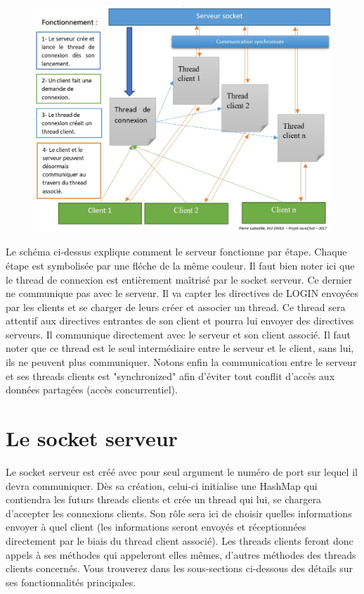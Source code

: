 \documentclass[a4paper,12pt]{report}
\begin{document}
    \begin{figure}[!ht]%
      \centering 
      \includegraphics[width=16cm]{serverWorks.jpg}
    \end{figure}

    \bigbreak
    Le schéma ci-dessus explique comment le serveur fonctionne par étape. Chaque étape est symbolisée par une fléche de la même couleur. Il faut bien noter ici que le thread de connexion est entièrement maîtrisé par le socket serveur. Ce dernier ne communique pas avec le serveur. Il va capter les directives de LOGIN envoyées par les clients et se charger de leurs créer et associer un thread.
    \medbreak
    Ce thread sera attentif aux directives entrantes de son client et pourra lui envoyer des directives serveurs. Il communique directement avec le serveur et son client associé. Il faut noter que ce thread est le seul intermédiaire entre le serveur et le client, sans lui, ils ne peuvent plus communiquer. Notons enfin la communication entre le serveur et ses threads clients est "synchronized" afin d'éviter tout conflit d'accès aux données partagées (accès concurrentiel).

    \section{Le socket serveur}
      Le socket serveur est créé avec pour seul argument le numéro de port sur lequel il devra communiquer. Dès sa création, celui-ci initialise une HashMap qui contiendra les futurs threads clients et crée un thread qui lui, se chargera d'accepter les connexions clients.
      \medbreak
      Son rôle sera ici de choisir quelles informations envoyer à quel client (les informations seront envoyés et réceptionnées directement par le biais du thread client associé). Les threads clients feront donc appels à ses méthodes qui appeleront elles mêmes, d'autres méthodes des threads clients concernés.
      \medbreak
      Vous trouverez dans les sous-sections ci-dessous des détails sur ses fonctionnalités principales.
\end{document}
